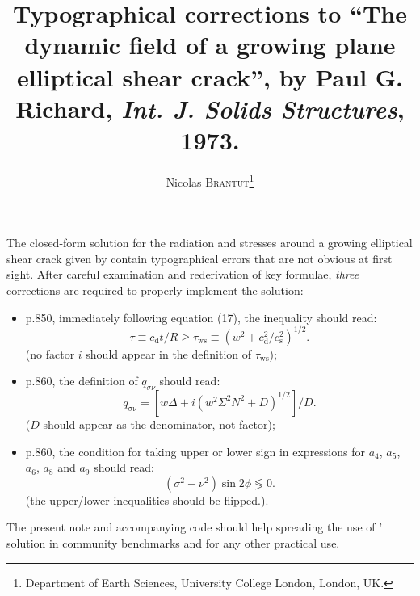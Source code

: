 \documentclass[11pt]{article}
\title{Typographical corrections to ``The dynamic field of a growing plane elliptical shear crack'', by Paul G. Richard, \emph{Int. J. Solids Structures}, 1973.}
\author{Nicolas \textsc{Brantut}\thanks{Department of Earth Sciences, University College London, London, UK.}}
\begin{document}
\maketitle

The closed-form solution for the radiation and stresses around a growing elliptical shear crack given by \citet{richards73} contain typographical errors that are not obvious at first sight. After careful examination and rederivation of key formulae, \emph{three} corrections are required to properly implement the solution:
\begin{itemize}
\item p.850, immediately following equation (17), the inequality should read:
  \begin{equation}\label{eq:c1}
    \tau\equiv
    c_\mathrm{d}t/R\geq\tau_\mathrm{ws}\equiv(w^2+c_\mathrm{d}^2/c_\mathrm{s}^2)^{1/2}.
  \end{equation}
  (no factor $i$ should appear in the definition of $\tau_\mathrm{ws}$);
\item p.860, the definition of $q_{\sigma\nu}$ should read:
  \begin{equation}\label{eq:c2}
    q_\mathrm{\sigma\nu} = [w\Delta + i(w^2\Sigma^2N^2 + D)^{1/2}]/D.
  \end{equation}
  ($D$ should appear as the denominator, not factor);
\item p.860, the condition for taking upper or lower sign in expressions for $a_4$, $a_5$, $a_6$, $a_8$ and $a_9$ should read:
  \begin{equation}\label{eq:c3}
    (\sigma^2-\nu^2)\sin2\phi \lessgtr 0.
  \end{equation}
  (the upper/lower inequalities should be flipped.).
\end{itemize}

The present note and accompanying code should help spreading the use of \citeauthor{richards73}' solution in community benchmarks and for any other practical use.



\end{document}
